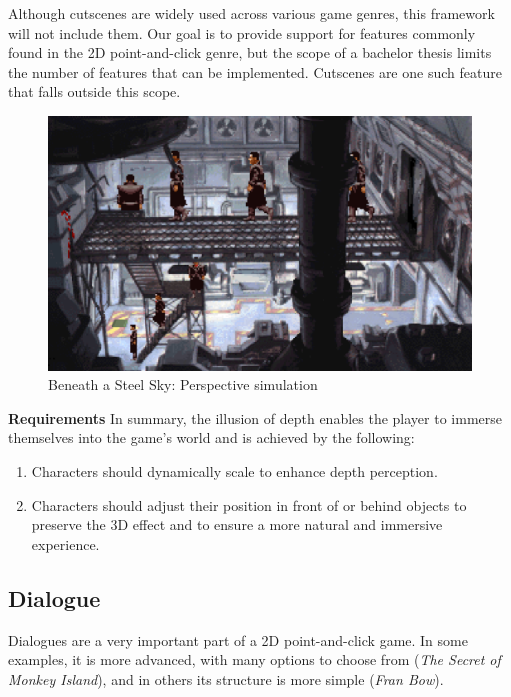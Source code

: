 \begin{notImplemented}
 \par
\vspace{3mm}
Although cutscenes are widely used across various game genres, this framework will not include them. Our goal is to provide support for features commonly found in the 2D point-and-click genre, but the scope of a bachelor thesis limits the number of features that can be implemented. Cutscenes are one such feature that falls outside this scope.
\end{notImplemented}

\begin{figure}[H]
\centering
\includegraphics[width=.8\linewidth]{img/M-BaSS00.png}
\caption{Beneath a Steel Sky: Perspective simulation}
\label{fig:M-BaSS0}
\end{figure}

\textbf{Requirements} \quad In summary, the illusion of depth enables the player to immerse themselves into the game's world and is achieved by the following:

\begin{enumerate}[label=\color{teal}\textbf{R{\arabic*}},resume]
  \item \label{intro:req:scale} Characters should dynamically scale to enhance depth perception.
  \item \label{intro:req:layers} Characters should adjust their position in front of or behind objects to preserve the 3D effect and to ensure a more natural and immersive experience.
\end{enumerate}
    
\subsection{Dialogue}
\label{sec:Dialogue}
Dialogues are a very important part of a 2D point-and-click game. In some examples, it is more advanced, with many options to choose from (\textit{The Secret of Monkey Island}), and in others its structure is more simple (\textit{Fran Bow}).  

